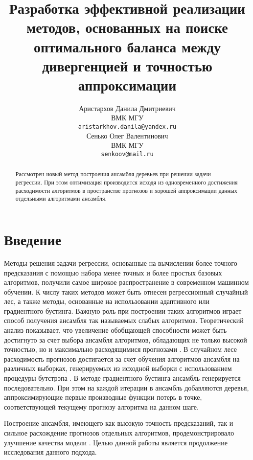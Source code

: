 \documentclass{article}
\title{Разработка эффективной реализации методов, основанных на поиске оптимального баланса между дивергенцией и точностью аппроксимации}
\author{ Аристархов Данила Дмитриевич \\
	ВМК МГУ \\
	\texttt{aristarkhov.danila@yandex.ru} \\
	\And
	Сенько Олег Валентинович \\
	ВМК МГУ \\
	\texttt{senkoov@mail.ru} \\
}
\date{}
\begin{document}
\maketitle

\begin{abstract}
	Рассмотрен новый метод построения ансамбля деревьев при решении задачи регрессии. При этом оптимизация производится исходя из одновременного достижения расходимости алгоритмов в пространстве прогнозов и хорошей аппроксимации данных отдельными алгоритмами ансамбля. 
\end{abstract}



\section{Введение}

Методы решения задачи регрессии, основанные на вычислении более точного предсказания с помощью набора менее точных и более простых базовых алгоритмов, получили самое широкое распространение в современном машинном обучении. К числу таких методов может быть отнесен регрессионный случайный лес, а также методы, основанные на использовании адаптивного или градиентного бустинга. Важную роль при построении таких алгоритмов играет способ получения ансамбля так называемых слабых алгоритмов. Теоретический анализ показывает, что увеличение обобщающей способности может быть достигнуто за счет выбора ансамбля алгоритмов, обладающих не только высокой точностью, но и максимально расходящимися прогнозами \citep{convex}. В случайном лесе расходимость прогнозов достигается за счет обучения алгоритмов ансамбля на различных выборках, генерируемых из исходной выборки с использованием процедуры бутстрэпа \citep{bagging}. В методе градиентного бустинга \citep{boosting} ансамбль генерируется последовательно. При этом на каждой итерации в ансамбль добавляются деревья, аппроксимирующие первые производные функции потерь в точке, соответствующей текущему прогнозу алгоритма на данном шаге.

Построение ансамбля, имеющего как высокую точность предсказаний, так и сильное расхождение прогнозов отдельных алгоритмов, продемонстрировало улучшение качества модели \citep{twolevel}. Целью данной работы является продолжение исследования данного подхода.

\end{document}
